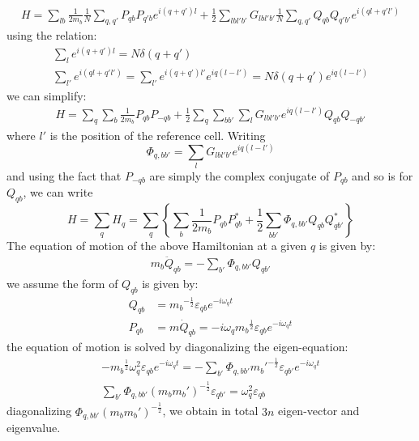 \documentclass{article}
\begin{document}
\begin{align}
    H = \sum_{lb} \frac{1}{2m_b} \frac{1}{N} \sum_{q,q'} P_{qb} P_{q'b} e^{i(q+q')l} 
       + \frac{1}{2} \sum_{lbl'b'} G_{lbl'b'} \frac{1}{N} \sum_{q,q'} Q_{qb} Q_{q'b'} e^{i(ql+q'l')}
\end{align}
using the relation:
\begin{gather}
    \sum_l e^{i(q+q')l} = N\delta(q+q') \\
    \sum_{l'} e^{i(ql+q'l')} = \sum_{l'} e^{i(q+q')l'} e^{iq(l-l')} = N\delta(q+q') e^{iq(l-l')}
\end{gather}
we can simplify:
\begin{align}
    H = \sum_{q} \sum_{b} \frac{1}{2m_b} P_{qb} P_{-qb}  
       + \frac{1}{2} \sum_{q} \sum_{bb'} \sum_{l} G_{lbl'b'} e^{iq(l-l')} Q_{qb} Q_{-qb'} 
\end{align}
where $l'$ is the position of the reference cell. Writing 
\begin{equation}
    \Phi_{q,bb'} = \sum_{l} G_{lbl'b'} e^{iq(l-l')}
\end{equation}
and using the fact that $P_{-qb}$ are simply the complex conjugate of $P_{qb}$ and so is for $Q_{qb}$, we can write
\begin{equation}
    H = \sum_{q} H_q = \sum_{q} \left\{ \sum_{b} \frac{1}{2m_b} P_{qb} P_{qb}^* + \frac{1}{2} \sum_{bb'} \Phi_{q,bb'} Q_{qb} Q_{qb'}^* \right\} \label{eq2}
\end{equation}
The equation of motion of the above Hamiltonian at a given $q$ is given by:
\begin{eqnarray}
    m_b \ddot{Q}_{qb} = - \sum_{b'} \Phi_{q,bb'} Q_{qb'}
\end{eqnarray}
we assume the form of $Q_{qb}$ is given by:
\begin{align}
    Q_{qb} &= {m_b}^{-\frac{1}{2}} \varepsilon_{qb} e^{-i\omega_{q}t} \\
    P_{qb} &= m\dot{Q}_{qb} = -i\omega_{q} {m_b}^{\frac{1}{2}} \varepsilon_{qb} e^{-i\omega_{q}t} 
\end{align}
the equation of motion is solved by diagonalizing the eigen-equation:
\begin{gather}
    - {m_b}^{\frac{1}{2}} \omega_{q}^2 \varepsilon_{qb} e^{-i\omega_{q}t} 
        = - \sum_{b'} \Phi_{q,bb'} {m_b'}^{-\frac{1}{2}} \varepsilon_{qb'} e^{-i\omega_{q}t} \\
    \sum_{b'} \Phi_{q,bb'} (m_b m_b')^{-\frac{1}{2}} \varepsilon_{qb'} = \omega_{q}^2 \varepsilon_{qb}
\end{gather}
diagonalizing $\Phi_{q,bb'} (m_b m_b')^{-\frac{1}{2}}$, we obtain in total $3n$ eigen-vector and eigenvalue.
\end{document}
